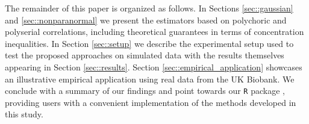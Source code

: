 The remainder of this paper is organized as follows. In Sections \ref{sec::gaussian} and \ref{sec::nonparanormal} we present the estimators based on polychoric and polyserial correlations, including theoretical guarantees in terms of concentration inequalities. In Section \ref{sec::setup} we describe the experimental setup used to test the proposed approaches on simulated data with the results themselves appearing in Section \ref{sec::results}. Section \ref{sec::empirical_application} showcases an illustrative empirical application using real data from the UK Biobank. We conclude with a summary of our findings and point towards our \texttt{R} package , providing users with a convenient implementation of the methods developed in this study.

